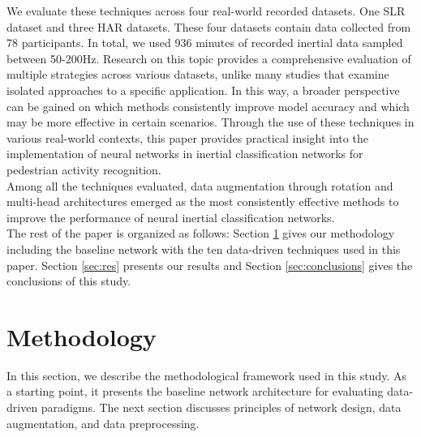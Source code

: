 \documentclass[journal]{IEEEtran}
\begin{document}
\noindent 
We evaluate these techniques across four real-world recorded datasets. One SLR dataset and three HAR datasets. These four datasets contain data  collected from 78 participants. In total, we used 936 minutes of recorded inertial data sampled between 50-200Hz.
Research on this topic provides a comprehensive evaluation of multiple strategies across various datasets, unlike many studies that examine isolated approaches to a specific application. In this way, a broader perspective can be gained on which methods consistently improve model accuracy and which may be more effective in certain scenarios. Through the use of these techniques in various real-world contexts, this paper provides practical insight into the implementation of neural networks in inertial classification networks for pedestrian activity recognition.\\
Among all the techniques evaluated, data augmentation through rotation and multi-head  architectures emerged as the most consistently effective methods to improve the performance of neural inertial classification networks. \\
\noindent The rest of the paper is organized as follows: Section \ref{sec:methodology} gives our methodology including the baseline network with the ten data-driven techniques used in this paper. Section \ref{sec:res} presents our results and Section \ref{sec:conclusions} gives the conclusions of this study. 
%
\section{Methodology} \label{sec:methodology}
\noindent 
In this section, we describe the methodological framework used in this study. As a starting point, it presents the baseline network architecture for evaluating data-driven paradigms. The next section discusses principles of network design, data augmentation, and data preprocessing. 
%
\end{document}
